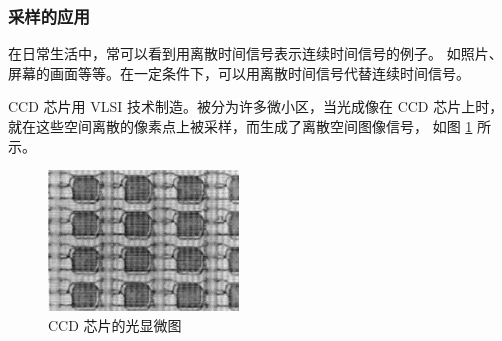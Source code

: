 \subsubsection{采样的应用}

在日常生活中，常可以看到用离散时间信号表示连续时间信号的例子。
如照片、屏幕的画面等等。在一定条件下，可以用离散时间信号代替连续时间信号。

\begin{example}
    CCD 芯片用 VLSI 技术制造。被分为许多微小区，当光成像在 CCD 芯片上时，
    就在这些空间离散的像素点上被采样，而生成了离散空间图像信号，
    如图 \ref{fig:ccd-chip} 所示。
    \begin{figure}[H]
        \centering
        \includegraphics[width=0.45\textwidth]{chap2/img/ccd-chip.png}
        \caption{CCD 芯片的光显微图}
        \label{fig:ccd-chip}
    \end{figure}
\end{example}
